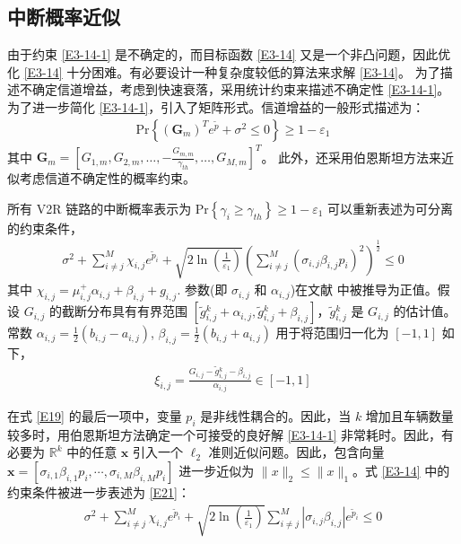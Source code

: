 \subsection{中断概率近似}\label{section3-3-2}

由于约束 \eqref{E3-14-1} 是不确定的，而目标函数 \eqref{E3-14} 又是一个非凸问题，因此优化 \eqref{E3-14} 十分困难。有必要设计一种复杂度较低的算法来求解 \eqref{E3-14}。 为了描述不确定信道增益，考虑到快速衰落，采用统计约束来描述不确定性 \eqref{E3-14-1}。 为了进一步简化 \eqref{E3-14-1}，引入了矩阵形式。信道增益的一般形式描述为：
\begin{eqnarray}\label{E18}
\textrm{Pr}\left\{\left(\textbf{G}_m\right)^Te^{\widetilde{p}}+\sigma^2\le0\right\}\geq1-\varepsilon_1
\end{eqnarray}
其中 $\textbf{G}_m=\left[G_{1,m},G_{2,m},\ldots,-\frac{G_{m,m}}{\gamma_{th}},\ldots,G_{M,m}\right]^T$。
此外，还采用伯恩斯坦方法来近似考虑信道不确定性的概率约束。

所有 V2R 链路的中断概率表示为 $\textrm{Pr}\left\{\gamma_i\geq\gamma_{th}\right\}\geq1-\varepsilon_1$
可以重新表述为可分离的约束条件，
\begin{eqnarray}\label{E19}
\!\!\!\sigma^2+\!\sum_{i\neq j}^{M}{\chi_{i,j}e^{{\widetilde{p}}_i}}+\sqrt{2\ln\left(\frac{1}{\varepsilon_1}\right)}\left(\sum_{i\neq j}^{M}\left(\sigma_{i,j}\beta_{i,j}p_i\right)^2\right)^\frac{1}{2}\!\!\!\!\!\le0
\end{eqnarray}
其中 $\chi_{i,j}=\mu_{i,j}^+\alpha_{i,j}+\beta_{i,j}+g_{i,j}$. 参数(即 $\sigma_{i,j}$ 和 $\alpha_{i,j}$)在文献 \cite{CCO} 中被推导为正值。假设 $G_{i,j}$ 的截断分布具有有界范围 $\left[{\widetilde{g}}\phantom{}_{i,j}^k+\alpha_{i,j},{\widetilde{g}}\phantom{}_{i,j}^k+\beta_{i,j}\right]$，${\widetilde{g}}\phantom{}_{i,j}^k$ 是 $G_{i,j}$ 的估计值。常数 $\alpha_{i,j}=\frac{1}{2}\left(b_{i,j}-a_{i,j}\right)$, $\beta_{i,j}=\frac{1}{2}\left(b_{i,j}+a_{i,j}\right)$ 用于将范围归一化为 $\left[-1,1\right]$ 如下，
\begin{eqnarray}\label{E20}
\xi_{i,j}=\frac{G_{i,j}-{\widetilde{g}}\phantom{}_{i,j}^k-\beta_{i,j}}{\alpha_{i,j}}\in\left[-1,1\right]
\end{eqnarray}

在式 \eqref{E19} 的最后一项中，变量 $p_i$ 是非线性耦合的。因此，当 $k$ 增加且车辆数量较多时，用伯恩斯坦方法确定一个可接受的良好解 \eqref{E3-14-1} 非常耗时。因此，有必要为 $\mathbb{R}^k$ 中的任意 $\mathbf{x}$ 引入一个 $\ell_2$ 准则近似问题。因此，包含向量 $\mathbf{x}=\left[\sigma_{i,1}\beta_{i,1}p_i,\cdots,\sigma_{i,M}\beta_{i,M}p_i\right]$ 进一步近似为 $\parallel x\parallel_2 \le \parallel x\parallel_1$。式 \eqref{E3-14} 中的约束条件被进一步表述为 \eqref{E21}：
\begin{eqnarray}\label{E21}
\sigma^2+\sum_{i\neq j}^{M}{\chi_{i,j}e^{{\widetilde{p}}_i}}+\sqrt{2\ln\left(\frac{1}{\varepsilon_1}\right)}\sum_{i\neq j}^{M}{\left|\sigma_{i,j}\beta_{i,j}\right|e^{{\widetilde{p}}_i}}\le0
\end{eqnarray}

